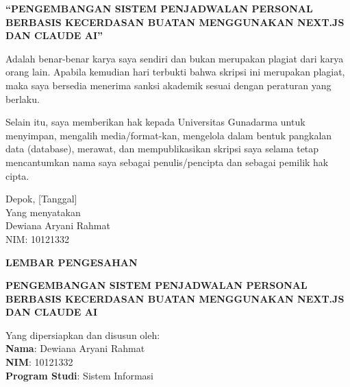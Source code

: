 \documentclass[12pt,a4paper,oneside]{report}
\begin{document}
\vspace{0.5cm}
\begin{center}
\textbf{``PENGEMBANGAN SISTEM PENJADWALAN PERSONAL BERBASIS KECERDASAN BUATAN MENGGUNAKAN NEXT.JS DAN CLAUDE AI''}
\end{center}

\vspace{1cm}

\noindent
Adalah benar-benar karya saya sendiri dan bukan merupakan plagiat dari karya orang lain. Apabila kemudian hari terbukti bahwa skripsi ini merupakan plagiat, maka saya bersedia menerima sanksi akademik sesuai dengan peraturan yang berlaku.

\vspace{1cm}

\noindent
Selain itu, saya memberikan hak kepada Universitas Gunadarma untuk menyimpan, mengalih media/format-kan, mengelola dalam bentuk pangkalan data (database), merawat, dan mempublikasikan skripsi saya selama tetap mencantumkan nama saya sebagai penulis/pencipta dan sebagai pemilik hak cipta.

\vspace{2cm}

\begin{flushright}
Depok, [Tanggal]\\[2cm]
Yang menyatakan\\[1cm]
Dewiana Aryani Rahmat\\
NIM: 10121332
\end{flushright}

\newpage
\thispagestyle{empty}
\begin{center}
{\Large\bfseries LEMBAR PENGESAHAN}
\end{center}

\vspace{1.5cm}

\begin{center}
{\large\bfseries PENGEMBANGAN SISTEM PENJADWALAN PERSONAL BERBASIS KECERDASAN BUATAN MENGGUNAKAN NEXT.JS DAN CLAUDE AI}
\end{center}

\vspace{1cm}

\noindent
Yang dipersiapkan dan disusun oleh:\\
\textbf{Nama}: Dewiana Aryani Rahmat\\
\textbf{NIM}: 10121332\\
\textbf{Program Studi}: Sistem Informasi
\end{document}
